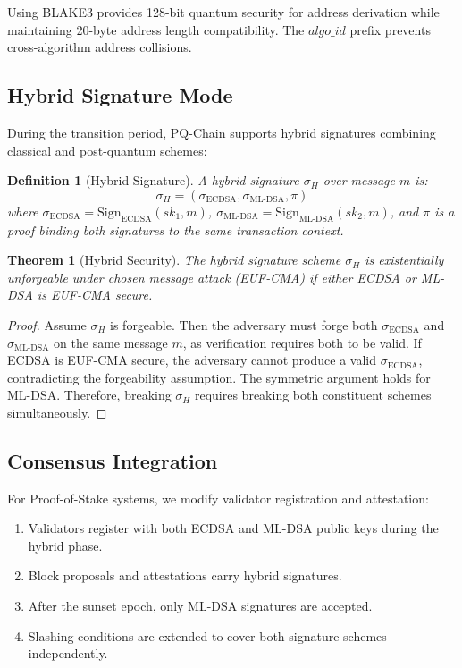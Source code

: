 \documentclass[12pt, a4paper, twocolumn]{article}
\newtheorem{definition}{Definition}
\newtheorem{theorem}{Theorem}
\begin{document}
Using BLAKE3 provides 128-bit quantum security for address derivation while maintaining 20-byte address length compatibility. The $\mathit{algo\_id}$ prefix prevents cross-algorithm address collisions.

\subsection{Hybrid Signature Mode}

During the transition period, PQ-Chain supports hybrid signatures combining classical and post-quantum schemes:

\begin{definition}[Hybrid Signature]
A hybrid signature $\sigma_H$ over message $m$ is:
\[
\sigma_H = (\sigma_{\text{ECDSA}}, \sigma_{\text{ML-DSA}}, \pi)
\]
where $\sigma_{\text{ECDSA}} = \text{Sign}_{\text{ECDSA}}(sk_1, m)$, $\sigma_{\text{ML-DSA}} = \text{Sign}_{\text{ML-DSA}}(sk_2, m)$, and $\pi$ is a proof binding both signatures to the same transaction context.
\end{definition}

\begin{theorem}[Hybrid Security]
The hybrid signature scheme $\sigma_H$ is existentially unforgeable under chosen message attack (EUF-CMA) if \emph{either} ECDSA or ML-DSA is EUF-CMA secure.
\end{theorem}

\begin{proof}
Assume $\sigma_H$ is forgeable. Then the adversary must forge both $\sigma_{\text{ECDSA}}$ and $\sigma_{\text{ML-DSA}}$ on the same message $m$, as verification requires both to be valid. If ECDSA is EUF-CMA secure, the adversary cannot produce a valid $\sigma_{\text{ECDSA}}$, contradicting the forgeability assumption. The symmetric argument holds for ML-DSA. Therefore, breaking $\sigma_H$ requires breaking both constituent schemes simultaneously.
\end{proof}

\subsection{Consensus Integration}

For Proof-of-Stake systems, we modify validator registration and attestation:

\begin{enumerate}[noitemsep]
  \item Validators register with both ECDSA and ML-DSA public keys during the hybrid phase.
  \item Block proposals and attestations carry hybrid signatures.
  \item After the sunset epoch, only ML-DSA signatures are accepted.
  \item Slashing conditions are extended to cover both signature schemes independently.
\end{enumerate}
\end{document}
